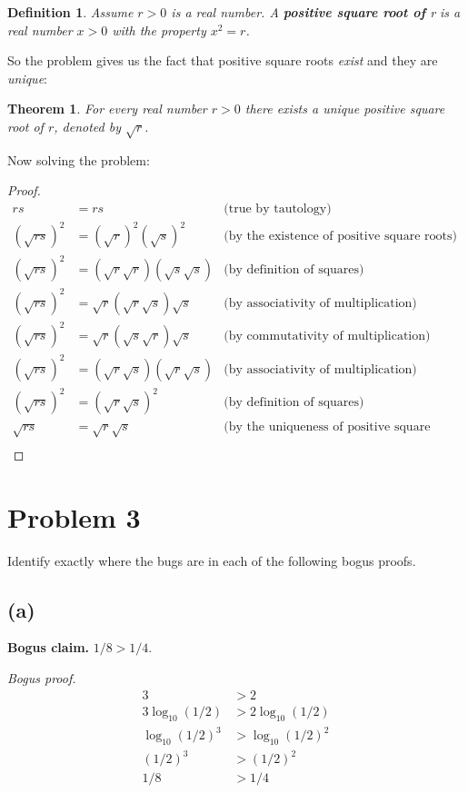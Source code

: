 \documentclass[14pt]{extarticle}
\newtheorem{defn}{Definition}
\newtheorem{thm}{Theorem}
\begin{document}
\begin{defn} 
Assume $r > 0$ is a real number. A {\bf positive square root of} r is a real number $x > 0$ with the property $x^2 = r$.
\end{defn}

So the problem gives us the fact that positive square roots {\it exist} and they are {\it unique}:

\begin{thm}
For every real number $r > 0$ there exists a unique positive square root of $r$, denoted by $\sqrt{r}$.
\end{thm}

Now solving the problem:
\begin{proof}
\begin{align*}
rs & = rs &\text{(true by tautology)}\\
(\sqrt{rs})^2 & =  (\sqrt{r})^2(\sqrt{s})^2 &\text{(by the existence of positive square roots)}\\
(\sqrt{rs})^2 & = (\sqrt{r}\sqrt{r})(\sqrt{s}\sqrt{s}) &\text{(by definition of squares)}\\
(\sqrt{rs})^2 & = \sqrt{r}(\sqrt{r}\sqrt{s})\sqrt{s} &\text{(by associativity of multiplication)}\\
(\sqrt{rs})^2 & = \sqrt{r}(\sqrt{s}\sqrt{r})\sqrt{s} &\text{(by commutativity of multiplication)}\\
(\sqrt{rs})^2 & = (\sqrt{r}\sqrt{s})(\sqrt{r}\sqrt{s}) &\text{(by associativity of multiplication)}\\
(\sqrt{rs})^2 & = (\sqrt{r}\sqrt{s})^2 &\text{(by definition of squares)}\\
\sqrt{rs} &=  \sqrt{r}\sqrt{s}  &\text{(by the uniqueness of positive square roots)}\\
\end{align*}
\end{proof}

\section{Problem 3}

Identify exactly where the bugs are in each of the following bogus proofs.

\subsection{(a)}

{\bf Bogus claim.} $1/8 > 1/4$.

{\it Bogus proof.}
\begin{align}
3 & > 2 \\
3\log_{10}(1/2) & > 2\log_{10}(1/2)\\
\log_{10}(1/2)^3 & > \log_{10}(1/2)^2\\
(1/2)^3 &> (1/2)^2 \\
1/8 &> 1/4
\end{align}
\end{document}
